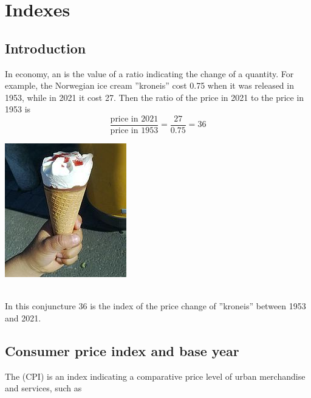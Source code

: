 




\newpage
\section{Indexes}
\subsection{Introduction}
\parbox{0.6\linewidth}{
In economy, an  is the value of a ratio indicating the change of a quantity. For example, the Norwegian ice cream ''kroneis'' cost 0.75 when it was released in 1953, while in 2021 it cost 27. Then the ratio of the price in 2021 to the price in 1953 is
	\[ \frac{\text{price in 2021}}{\text{price in 1953}}=\frac{27}{0.75}= 36 \]
}
\parbox[r]{0.3\linewidth}{\includegraphics[scale=2]{kr}}\\[2pt]
In this conjuncture 36 is the index of the price change of ''kroneis'' between 1953 and 2021.

\subsection{Consumer price index and base year}
The  (CPI) is an index indicating a comparative price level of urban merchandise and services, such as\vs

